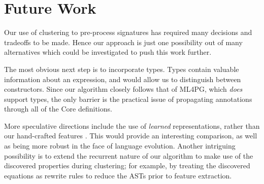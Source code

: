 \section{Future Work}
\label{sec:future}

Our use of clustering to pre-process \qspec{} signatures has required many decisions and tradeoffs to be made. Hence our approach is just one possibility out of many alternatives which could be investigated to push this work further.

The most obvious next step is to incorporate types. Types contain valuable information about an expression, and would allow us to distinguish between constructors. Since our algorithm closely follows that of ML4PG, which \emph{does} support types, the only barrier is the practical issue of propagating annotations through all of the Core definitions.

More speculative directions include the use of \emph{learned} representations, rather than our hand-crafted features \cite{bengio2013representation}. This would provide an interesting comparison, as well as being more robust in the face of language evolution. Another intriguing possibility is to extend the recurrent nature of our algorithm to make use of the discovered properties during clustering; for example, by treating the discovered equations as rewrite rules to reduce the ASTs prior to feature extraction.
